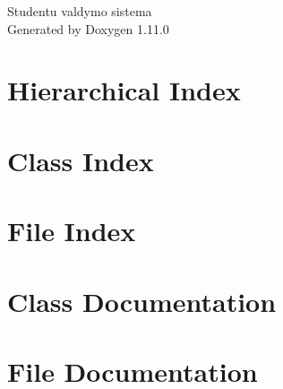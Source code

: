 \documentclass[twoside]{book}
\newcommand{\+}{\discretionary{\mbox{\scriptsize$\hookleftarrow$}}{}{}}
\newcommand{\clearemptydoublepage}{%
    \newpage{\pagestyle{empty}\cleardoublepage}%
  }
\begin{document}
  \raggedbottom
    \hypersetup{pageanchor=false,
                bookmarksnumbered=true,
                pdfencoding=unicode
               }
  \begin{titlepage}
  \vspace*{7cm}
  \begin{center}%
  {\Large Studentu valdymo sistema}\\
  \vspace*{1cm}
  {\large Generated by Doxygen 1.11.0}\\
  \end{center}
  \end{titlepage}
  \clearemptydoublepage
  \tableofcontents
  \clearemptydoublepage
  \hypersetup{pageanchor=true}

\chapter{Hierarchical Index}

\chapter{Class Index}

\chapter{File Index}

\chapter{Class Documentation}


\chapter{File Documentation}










  \backmatter
  \newpage
  \clearemptydoublepage
  \printindex
\end{document}
